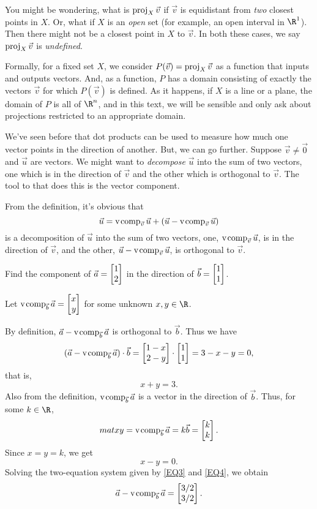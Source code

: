 You might be wondering, what is $\operatorname{proj}_X\vec v$ if $\vec v$ is equidistant from \emph{two}
closest points in $X$. Or, what if $X$ is an \emph{open} set (for example, an open interval in $\R^1$).
Then there might not be a closest point in $X$ to $\vec v$. In both these cases, we say $\operatorname{proj}_X\vec v$
is \emph{undefined}.

Formally, for a fixed set $X$, we consider $P(\vec v)=\operatorname{proj}_X\vec v$ as a function that inputs and outputs
vectors. And, as a function, $P$ has a domain consisting of exactly the vectors $\vec v$ for which $P(\vec v)$
is defined. As it happens, if $X$ is a line or a plane, the domain of $P$ is all of $\R^n$, and in this text,
we will be sensible and only ask about projections restricted to an appropriate domain. 


We've seen before that dot products can be used to measure how much one
vector points in the direction of another. But, we can go further. Suppose 
$\vec v\neq \vec 0$ and $\vec u$ are vectors. We might want to \emph{decompose}
$\vec u$ into the sum of two vectors, one which is in the direction of $\vec v$
and the other which is orthogonal to $\vec v$. The tool to that does this is the vector component.


From the definition, it's obvious that
\[
	\vec u=\operatorname{v\hspace{1pt}comp}_{\vec v}\vec u + (\vec u-\operatorname{v\hspace{1pt}comp}_{\vec v}\vec u)
\]
is a decomposition of $\vec u$ into the sum of two vectors, one, $\operatorname{v\hspace{1pt}comp}_{\vec v}\vec u$, is in the direction of $\vec v$,
and the other, $\vec u-\operatorname{v\hspace{1pt}comp}_{\vec v}\vec u$, is orthogonal to $\vec v$.

\begin{example}
	Find the component of $\vec a=\mat{1\\2}$ in the direction of $\vec b=\mat{1\\1}$.

    Let $\Vcomp_{\vec b}\vec a=\mat{x\\y}$ for some unknown $x,y\in\R$. 
    
    By definition, $\vec a - \operatorname{v\hspace{1pt}comp}_{\vec b}\vec a$ is orthogonal to $\vec b$. Thus we have
    \[
        (\vec a-\Vcomp_{\vec b}\vec a)\cdot\vec b=\mat{1-x\\2-y}\cdot\mat{1\\1}=3-x-y=0,
    \]
    that is,
    \begin{equation}
    \label{EQ3}
        x+y=3.
    \end{equation}
    Also from the definition, $\operatorname{v\hspace{1pt}comp}_{\vec b}\vec a$ is a vector in the direction of $\vec b$. Thus, for some $k\in\R$,
    \[
         mat{x\\y}=\Vcomp_{\vec b}\vec a = k\vec b=\mat{k\\k}.
    \]
    Since $x=y=k$, we get
    \begin{equation}
    \label{EQ4}
        x-y=0.
    \end{equation}
    Solving the two-equation system given by \eqref{EQ3} and \eqref{EQ4}, we obtain
    \[
        \vec a-\Vcomp_{\vec b}\vec a=\mat{3/2\\3/2}.
    \]
\end{example}

